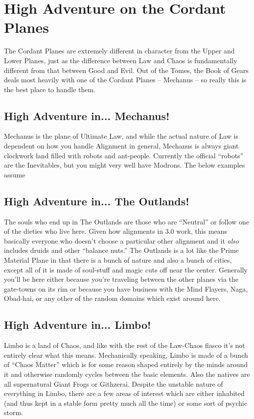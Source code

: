 \chapter{High Adventure on the Cordant Planes}

The Cordant Planes are extremely different in character from the Upper and Lower Planes, just as the difference between Law and Chaos is fundamentally different from that between Good and Evil. Out of the Tomes, the Book of Gears deals most heavily with one of the Cordant Planes -- Mechanus -- so really this is the best place to handle them.

\section{High Adventure in... Mechanus!}

Mechanus is the plane of Ultimate Law, and while the actual nature of Law is dependent on how you handle Alignment in general, Mechanus is always giant clockwork land filled with robots and ant-people. Currently the official ``robots'' are the Inevitables, but you might very well have Modrons. The below examples assume

%

\section{High Adventure in... The Outlands!}

The souls who end up in The Outlands are those who are ``Neutral'' or follow one of the dieties who live here. Given how alignments in 3.0 work, this means basically everyone who doesn't choose a particular other alignment and it \emph{also} includes druids and other ``balance nuts.'' The Outlands is a lot like the Prime Material Plane in that there is a bunch of nature and also a bunch of cities, except all of it is made of soul-stuff and magic cuts off near the center. Generally you'll be here either because you're traveling between the other planes via the gate-towns on its rim or because you have business with the Mind Flayers, Naga, Obad-hai, or any other of the random domains which exist around here.

%

\section{High Adventure in... Limbo!}

Limbo is a land of Chaos, and like with the rest of the Law-Chaos fiasco it's not entirely clear what this means. Mechanically speaking, Limbo is made of a bunch of ``Chaos Matter'' which is for some reason shaped entirely by the minds around it and otherwise randomly cycles between the basic elements. Also the natives are all supernatural Giant Frogs or Githzerai. Despite the unstable nature of everything in Limbo, there are a few areas of interest which are either inhabited (and thus kept in a stable form pretty much all the time) or some sort of psychic storm.

%
